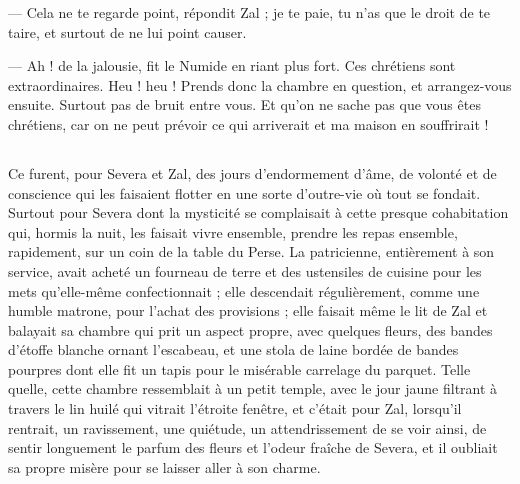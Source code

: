 \documentclass[a4paper, 11pt, oneside, polutonikogreek, french]{article}
\begin{document}
--- Cela ne te regarde point, répondit Zal ; je te paie, tu n'as que le droit de te taire, et surtout de ne lui point causer.

--- Ah ! de la jalousie, fit le Numide en riant plus fort. Ces chrétiens sont extraordinaires. Heu ! heu ! Prends donc la chambre en question, et arrangez-vous ensuite. Surtout pas de bruit entre vous. Et qu'on ne sache pas que vous êtes chrétiens, car on ne peut prévoir ce qui arriverait et ma maison en souffrirait !
\clearpage
\subsection{}
\paragraph{}
Ce furent, pour Severa et Zal, des jours d'endormement d'âme, de volonté et de conscience qui les faisaient flotter en une sorte d'outre-vie où tout se fondait. Surtout pour Severa dont la mysticité se complaisait à cette presque cohabitation qui, hormis la nuit, les faisait vivre ensemble, prendre les repas ensemble, rapidement, sur un coin de la table du Perse. La patricienne, entièrement à son service, avait acheté un fourneau de terre et des ustensiles de cuisine pour les mets qu'elle-même confectionnait ; elle descendait régulièrement, comme une humble matrone, pour l'achat des provisions ; elle faisait même le lit de Zal et balayait sa chambre qui prit un aspect propre, avec quelques fleurs, des bandes d'étoffe blanche ornant l'escabeau, et une stola de laine bordée de bandes pourpres dont elle fit un tapis pour le misérable carrelage du parquet. Telle quelle, cette chambre ressemblait à un petit temple, avec le jour jaune filtrant à travers le lin huilé qui vitrait l'étroite fenêtre, et c'était pour Zal, lorsqu'il rentrait, un ravissement, une quiétude, un attendrissement de se voir ainsi, de sentir longuement le parfum des fleurs et l'odeur fraîche de Severa, et il oubliait sa propre misère pour se laisser aller à son charme.
\end{document}
